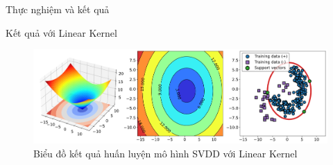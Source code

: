 \documentclass[
	10pt,                %
	aspectratio=169,     %
]{beamer}
\begin{document}
            \begin{frame}{Thực nghiệm và kết quả}
                \begin{block}{Kết quả với Linear Kernel}
            		\begin{figure}
                		\centering
            	\includegraphics[scale=0.22]{figures/linear_result.png}
                		\caption{ Biểu đồ kết quả huấn luyện mô hình SVDD với Linear Kernel}
                	\end{figure}
                \end{block}
            \end{frame}	
            
\end{document}
